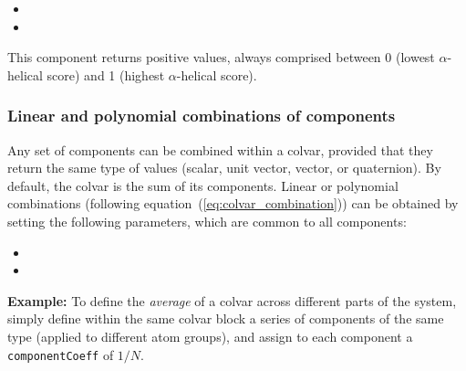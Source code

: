 \begin{itemize}
\item %

\item %

\end{itemize}

This component returns positive values, always comprised between 0
(lowest $\alpha$-helical score) and 1 (highest $\alpha$-helical
score).


\subsubsection{Linear and polynomial combinations of components}
\label{sec:cvc_superp}
Any set of components can be combined within a colvar, provided that
they return the same type of values (scalar, unit vector, vector, or
quaternion).  By default, the colvar is the sum of its components.
Linear or polynomial combinations (following
equation~(\ref{eq:colvar_combination})) can be obtained by setting the
following parameters, which are common to all components:
\begin{itemize}
\item %

\item %
\end{itemize}

\textbf{Example:} To define the \emph{average} of a colvar across
different parts of the system, simply define within the same colvar
block a series of components of the same type (applied to different
atom groups), and assign to each component a \texttt{componentCoeff}
of $1/N$.


